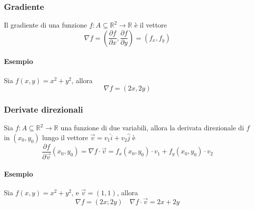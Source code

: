 \documentclass[twoside]{article}
\begin{document}
\subsubsection{Gradiente}
Il gradiente di una funzione \(f : A \subseteq \mathbb{R}^2 \rightarrow \mathbb{R}\) è il vettore
\begin{equation}
  \boxed{
    \nabla f =  \left(\frac{\partial f}{\partial x}, \frac{\partial f}{\partial y}\right) = \left(f_x, f_y\right)
  }
\end{equation}
\paragraph[short]{Esempio}
Sia \(f(x, y) = x^2 + y^2\), allora
\begin{equation*}
  \nabla f = \left(2x, 2y\right)
\end{equation*}
\subsubsection{Derivate direzionali}
Sia \(f : A \subseteq \mathbb{R}^2 \rightarrow \mathbb{R}\) una funzione di due variabili, allora la derivata direzionale di \(f\) in \((x_0, y_0)\) lungo il vettore \(\vec{v} = v_1 \hat{i} + v_2 \hat{j}\) è
\begin{equation}
  \frac{\partial f}{\partial \vec{v}} (x_0, y_0) = \nabla f \cdot \vec{v} = f_x(x_0, y_0) \cdot v_1 + f_y(x_0, y_0) \cdot v_2
\end{equation}
\paragraph[short]{Esempio}
Sia \(f(x, y) = x^2 + y^2\), e \(\vec{v} = \left(1, 1\right)\), allora
\begin{equation*}
  \nabla f = \left(2x; 2y\right) \quad \nabla f \cdot \vec{v} = 2x + 2y
\end{equation*}
\end{document}
